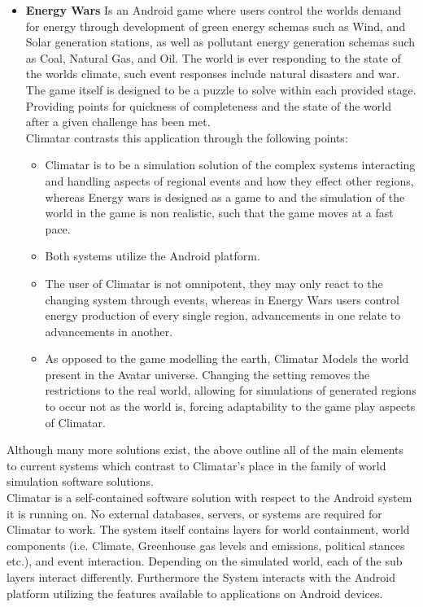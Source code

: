 \documentclass[]{article}
\begin{document}
\begin{itemize}
	\item \textbf{Energy Wars} 
		Is an Android game\cite{EW} where users control the worlds demand for energy through development of green energy schemas such as Wind, and Solar generation stations, as well as pollutant energy generation schemas such as Coal, Natural Gas, and Oil. The world is ever responding to the state of the worlds climate, such event responses include natural disasters and war. The game itself is designed to be a puzzle to solve within each provided stage. Providing points for quickness of completeness and the state of the world after a given challenge has been met.\\
		Climatar contrasts this application through the following points:
		\begin{itemize}
			\item Climatar is to be a simulation solution of the complex systems interacting and handling aspects of regional events and how they effect other regions, whereas Energy wars is designed as a game to and the simulation of the world in the game is non realistic, such that the game moves at a fast pace.
			\item Both systems utilize the Android platform.
			\item The user of Climatar is not omnipotent, they may only react to the changing system through events, whereas in Energy Wars users control energy production of every single region, advancements in one relate to advancements in another.
			\item As opposed to the game modelling the earth, Climatar Models the world present in the Avatar universe. Changing the setting removes the restrictions to the real world, allowing for  simulations of generated regions to occur not as the world is, forcing adaptability to the game play aspects of Climatar.
		\end{itemize}
\end{itemize}

Although many more solutions exist, the above outline all of the main elements to current systems which contrast to Climatar's place in the family of world simulation software solutions.\\

Climatar is a self-contained software solution with respect to the Android system it is running on. No external databases, servers, or systems are required for Climatar to work. The system itself contains layers for world containment, world components (i.e. Climate, Greenhouse gas levels and emissions, political stances etc.), and event interaction. Depending on the simulated world, each of the sub layers interact differently. Furthermore the System interacts with the Android platform utilizing the features available to applications on Android devices.
\end{document}
